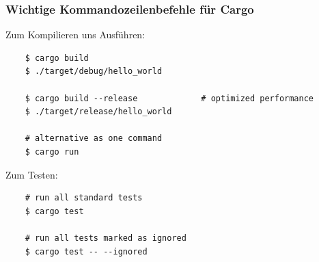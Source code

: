 \subsubsection{Wichtige Kommandozeilenbefehle für Cargo}

Zum Kompilieren uns Ausführen:

\begin{lstlisting}
    $ cargo build
    $ ./target/debug/hello_world

    $ cargo build --release             # optimized performance
    $ ./target/release/hello_world

    # alternative as one command
    $ cargo run
\end{lstlisting}

Zum Testen:

\begin{lstlisting}
    # run all standard tests
    $ cargo test

    # run all tests marked as ignored
    $ cargo test -- --ignored
\end{lstlisting}
